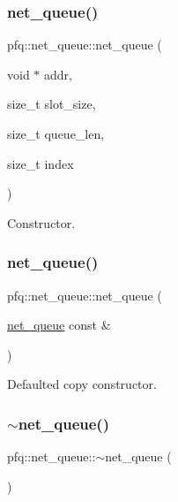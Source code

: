 \subsubsection{\texorpdfstring{net\+\_\+queue()}{net\_queue()}\hspace{0.1cm}{\footnotesize\ttfamily [2/3]}}
{\footnotesize\ttfamily pfq\+::net\+\_\+queue\+::net\+\_\+queue (\begin{DoxyParamCaption}\item[{void $\ast$}]{addr,  }\item[{size\+\_\+t}]{slot\+\_\+size,  }\item[{size\+\_\+t}]{queue\+\_\+len,  }\item[{size\+\_\+t}]{index }\end{DoxyParamCaption})\hspace{0.3cm}{\ttfamily [inline]}}



Constructor. 

\mbox{\label{classpfq_1_1net__queue_a71df078739d1e6a0817ac8bde9fa6f7a}} 
\subsubsection{\texorpdfstring{net\+\_\+queue()}{net\_queue()}\hspace{0.1cm}{\footnotesize\ttfamily [3/3]}}
{\footnotesize\ttfamily pfq\+::net\+\_\+queue\+::net\+\_\+queue (\begin{DoxyParamCaption}\item[{\hyperlink{classpfq_1_1net__queue}{net\+\_\+queue} const \&}]{ }\end{DoxyParamCaption})\hspace{0.3cm}{\ttfamily [default]}}



Defaulted copy constructor. 

\mbox{\label{classpfq_1_1net__queue_a87fd3585cac30773e7f5ff6951e74957}} 
\subsubsection{\texorpdfstring{$\sim$net\+\_\+queue()}{~net\_queue()}}
{\footnotesize\ttfamily pfq\+::net\+\_\+queue\+::$\sim$net\+\_\+queue (\begin{DoxyParamCaption}{ }\end{DoxyParamCaption})\hspace{0.3cm}{\ttfamily [default]}}



